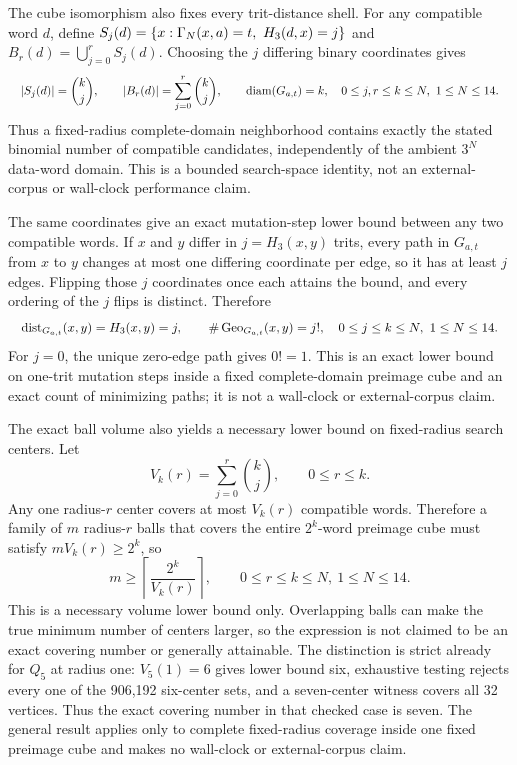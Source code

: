 \documentclass{article}
\newcommand{\fitmath}[1]{\resizebox{0.99\linewidth}{!}{$\displaystyle #1$}}
\begin{document}
The cube isomorphism also fixes every trit-distance shell. For any compatible
word $d$, define
$S_j(d)=\{x:\Gamma_{N}\!\left(x,a\right)=t,\ H_3(d,x)=j\}$ and
$B_r(d)=\bigcup_{j=0}^{r}S_j(d)$. Choosing the $j$ differing binary coordinates
gives
\begin{equation}
  \fitmath{%
    |S_j(d)|=\binom{k}{j},\qquad
    |B_r(d)|=\sum_{j=0}^{r}\binom{k}{j},\qquad
    \operatorname{diam}(G_{a,t})=k,
    \quad 0\leq j,r\leq k\leq N,\ 1\leq N\leq14.
  }
  \label{eq:optimization-crazy-profile-preimage-cube-distance}
\end{equation}
Thus a fixed-radius complete-domain neighborhood contains exactly the stated
binomial number of compatible candidates, independently of the ambient
$3^N$ data-word domain. This is a bounded search-space identity, not an
external-corpus or wall-clock performance claim.

The same coordinates give an exact mutation-step lower bound between any two
compatible words. If $x$ and $y$ differ in $j=H_3(x,y)$ trits, every path in
$G_{a,t}$ from $x$ to $y$ changes at most one differing coordinate per edge, so
it has at least $j$ edges. Flipping those $j$ coordinates once each attains the
bound, and every ordering of the $j$ flips is distinct. Therefore
\begin{equation}
  \fitmath{%
    \operatorname{dist}_{G_{a,t}}(x,y)=H_3(x,y)=j,
    \qquad
    \#\operatorname{Geo}_{G_{a,t}}(x,y)=j!,
    \quad 0\leq j\leq k\leq N,\ 1\leq N\leq14.
  }
  \label{eq:optimization-crazy-profile-preimage-cube-geodesic}
\end{equation}
For $j=0$, the unique zero-edge path gives $0!=1$. This is an exact lower bound
on one-trit mutation steps inside a fixed complete-domain preimage cube and an
exact count of minimizing paths; it is not a wall-clock or external-corpus
claim.

The exact ball volume also yields a necessary lower bound on fixed-radius search
centers. Let
\[
  V_k(r)=\sum_{j=0}^{r}\binom{k}{j},
  \qquad 0\leq r\leq k.
\]
Any one radius-$r$ center covers at most $V_k(r)$ compatible words. Therefore a
family of $m$ radius-$r$ balls that covers the entire $2^k$-word preimage cube
must satisfy $mV_k(r)\geq2^k$, so
\begin{equation}
  m\geq
  \left\lceil\frac{2^k}{V_k(r)}\right\rceil,
  \qquad 0\leq r\leq k\leq N,\ 1\leq N\leq14.
  \label{eq:optimization-crazy-profile-preimage-cube-covering-lower-bound}
\end{equation}
This is a necessary volume lower bound only. Overlapping balls can make the true
minimum number of centers larger, so the expression is not claimed to be an
exact covering number or generally attainable. The distinction is strict
already for $Q_5$ at radius one: $V_5(1)=6$ gives lower bound six, exhaustive
testing rejects every one of the 906,192 six-center sets, and a
seven-center witness covers all 32 vertices. Thus the exact covering number in
that checked case is seven. The general result applies only to complete
fixed-radius coverage inside one fixed preimage cube and makes no wall-clock or
external-corpus claim.
\end{document}
